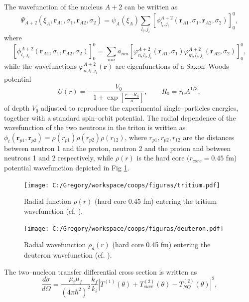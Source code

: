 The wavefunction of the nucleus $A+2$ can be written as 
\begin{equation}\label{eq7_1_1}
\Psi_{A+2}(\xi_A,\mathbf r_{A1},\sigma_1,\mathbf r_{A2},\sigma_2)=\psi_A(\xi_A)\sum_{l_i,j_i}[\phi^{A+2}_{l_i,j_i}(\mathbf r_{A1},\sigma_1,\mathbf r_{A2},\sigma_2)]^0_0,
\end{equation} 
where 
\begin{equation}\label{eq7_1_2}
[\phi^{A+2}_{l_i,j_i}(\mathbf r_{A1},\sigma_1,\mathbf r_{A2},\sigma_2)]^0_0=\sum_{nm}a_{nm}\left[\varphi^{A+2}_{n,l_i,j_i}(\mathbf r_{A1},\sigma_1)\varphi^{A+2}_{m,l_i,j_i}(\mathbf r_{A2},\sigma_2)\right]^0_0,
\end{equation} 
while the wavefunctions $\varphi^{A+2}_{n,l_i,j_i}(\mathbf r)$ are eigenfunctions of a Saxon--Woods potential
\begin{equation}\label{Eq17}
U(r)=-\frac{V_0}
{1+\exp\left[\frac{r-R_0}{a}\right]},\quad\quad R_0=r_0 A^{1/3},
\end{equation}
of depth $V_0$  adjusted to reproduce the experimental single--particles energies, together with a standard spin--orbit potential.
 The radial dependence of the  wavefunction of the two neutrons in the triton is written as $\phi_t(\mathbf r_{p1},\mathbf r_{p2})=\rho(r_{p1})\rho(r_{p2})\rho(r_{12})$, where $r_{p1},r_{p2},r_{12}$ are the distances between neutron 1 and the proton, neutron 2 and the proton and between neutrons 1 and 2 respectively, while $\rho(r)$ is the hard core $(r_{core}=0.45$ fm) potential  wavefunction  depicted in Fig \ref{fig7_1_1}.
 
\begin{figure}
\centerline{\texttt{[image: C:/Gregory/workspace/coops/figuras/tritium.pdf]}}
\caption{Radial function $\rho(r)$ (hard core 0.45 fm) entering the tritium wavefunction (cf. \cite{Tang:65}).}\label{fig7_1_1}
\end{figure}
\begin{figure}
\centerline{\texttt{[image: C:/Gregory/workspace/coops/figuras/deuteron.pdf]}}
\caption{Radial wavefunction $\rho_d(r)$ (hard core 0.45 fm) entering the deuteron wavefunction (cf. \cite{Tang:65}).}\label{fig7_1_2}
\end{figure}
The two--nucleon transfer differential cross section is written as
\begin{equation}\label{eq5.1.4}
\frac{d\sigma}{d\Omega}=\frac{\mu_i\mu_f}{(4\pi\hbar^2)^2}\frac{k_f}{k_i}\left|T^{(1)}(\theta)+T^{(2)}_{succ}(\theta)-T^{(2)}_{NO}(\theta)\right|^2,
\end{equation}

